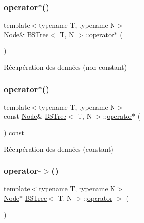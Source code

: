 \subsubsection{\texorpdfstring{operator$\ast$()}{operator*()}\hspace{0.1cm}{\footnotesize\ttfamily [1/2]}}
{\footnotesize\ttfamily template$<$typename T, typename N$>$ \\
\hyperlink{classBSTree_a9c1a06548b3ff425e1d906f17ce2c858}{Node}\& \hyperlink{classBSTree}{B\+S\+Tree}$<$ T, N $>$\+::\hyperlink{classBSTree_a1e8a7cc184833a959c0e8139756c22a7}{operator}$\ast$ (\begin{DoxyParamCaption}{ }\end{DoxyParamCaption})\hspace{0.3cm}{\ttfamily [inline]}}

Récupération des données (non constant) \mbox{\label{classBSTree_a59915c35b54e0cef2260759c1392d006}} 
\subsubsection{\texorpdfstring{operator$\ast$()}{operator*()}\hspace{0.1cm}{\footnotesize\ttfamily [2/2]}}
{\footnotesize\ttfamily template$<$typename T, typename N$>$ \\
const \hyperlink{classBSTree_a9c1a06548b3ff425e1d906f17ce2c858}{Node}\& \hyperlink{classBSTree}{B\+S\+Tree}$<$ T, N $>$\+::\hyperlink{classBSTree_a1e8a7cc184833a959c0e8139756c22a7}{operator}$\ast$ (\begin{DoxyParamCaption}{ }\end{DoxyParamCaption}) const\hspace{0.3cm}{\ttfamily [inline]}}

Récupération des données (constant) \mbox{\label{classBSTree_af16e2ebbb7e4b77039cd4733d0933311}} 
\subsubsection{\texorpdfstring{operator-\/$>$()}{operator->()}\hspace{0.1cm}{\footnotesize\ttfamily [1/2]}}
{\footnotesize\ttfamily template$<$typename T, typename N$>$ \\
\hyperlink{classBSTree_a9c1a06548b3ff425e1d906f17ce2c858}{Node}$\ast$ \hyperlink{classBSTree}{B\+S\+Tree}$<$ T, N $>$\+::\hyperlink{classBSTree_a1e8a7cc184833a959c0e8139756c22a7}{operator}-\/$>$ (\begin{DoxyParamCaption}{ }\end{DoxyParamCaption})\hspace{0.3cm}{\ttfamily [inline]}}

